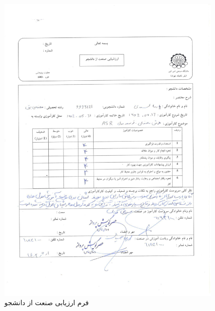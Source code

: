 \begin{figure}[H]
  \centering
  \includegraphics[width=1\textwidth]{letters/arzyabi.jpg}
  \caption{
    فرم ارزیابی صنعت از دانشجو
  }
  \label{img:arzyabi}
\end{figure}

